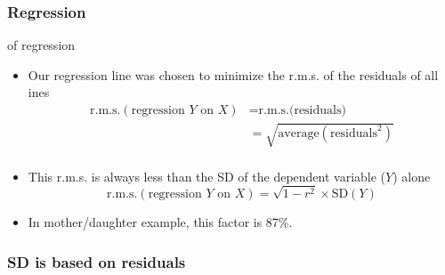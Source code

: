 \documentclass[handout]{beamer}
\begin{document}

   \begin{frame} \frametitle{Regression}

   \begin{block}
   { of regression}
   \begin{itemize}
   \item Our regression line was chosen to minimize
   the r.m.s. of the residuals of all ines
   $$
   \begin{aligned}
   \text{r.m.s.}(\text{regression $Y$ on $X$}) &= \text{r.m.s.(residuals)} \\
   &= \sqrt{\text{average}(\text{residuals}^2)} \\
   \end{aligned}
   $$
   \item This r.m.s. is always less than the SD of
   the dependent variable ($Y$) alone
   $$
   \text{r.m.s.}(\text{regression $Y$ on $X$}) = \sqrt{1-r^2} \times \text{SD}(Y)
   $$
   \item In mother/daughter example, this factor is 87\%.
   \end{itemize}
   \end{block}
   \end{frame}



   \begin{frame}
   \frametitle{SD is based on residuals}
   \begin{center}
   \end{center}

   \end{frame}

\end{document}

